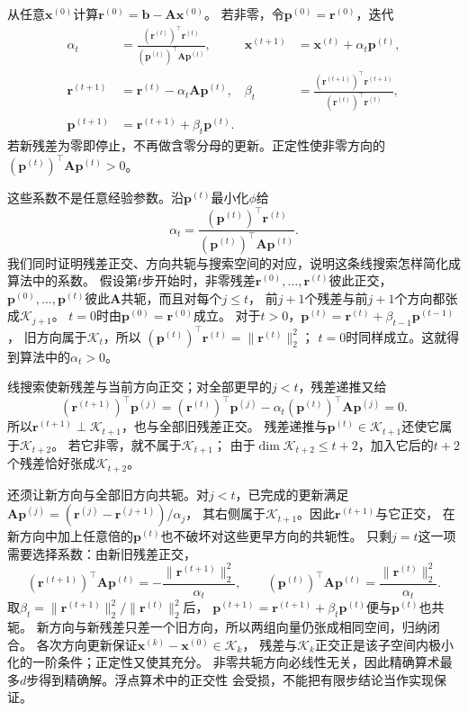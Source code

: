 从任意$\bm x^{(0)}$计算$\bm r^{(0)}=\bm b-\bm A\bm x^{(0)}$。
若非零，令$\bm p^{(0)}=\bm r^{(0)}$，迭代
\begin{align*}
 \alpha_t&=\frac{(\bm r^{(t)})^\top\bm r^{(t)}}
                 {(\bm p^{(t)})^\top\bm A\bm p^{(t)}},&
 \bm x^{(t+1)}&=\bm x^{(t)}+\alpha_t\bm p^{(t)},\\
 \bm r^{(t+1)}&=\bm r^{(t)}-\alpha_t\bm A\bm p^{(t)},&
 \beta_t&=\frac{(\bm r^{(t+1)})^\top\bm r^{(t+1)}}
                {(\bm r^{(t)})^\top\bm r^{(t)}},\\
 \bm p^{(t+1)}&=\bm r^{(t+1)}+\beta_t\bm p^{(t)}.
\end{align*}
若新残差为零即停止，不再做含零分母的更新。正定性使非零方向的
$(\bm p^{(t)})^\top\bm A\bm p^{(t)}>0$。

这些系数不是任意经验参数。沿$\bm p^{(t)}$最小化$\phi$给
\[
 \alpha_t=\frac{(\bm p^{(t)})^\top\bm r^{(t)}}
                 {(\bm p^{(t)})^\top\bm A\bm p^{(t)}}.
\]
我们同时证明残差正交、方向共轭与搜索空间的对应，说明这条线搜索怎样简化成算法中的系数。
假设第$t$步开始时，非零残差$\bm r^{(0)},\ldots,\bm r^{(t)}$彼此正交，
$\bm p^{(0)},\ldots,\bm p^{(t)}$彼此$\bm A$共轭，而且对每个$j\leq t$，
前$j+1$个残差与前$j+1$个方向都张成$\mathcal K_{j+1}$。
$t=0$时由$\bm p^{(0)}=\bm r^{(0)}$成立。
对于$t>0$，$\bm p^{(t)}=\bm r^{(t)}+\beta_{t-1}\bm p^{(t-1)}$，
旧方向属于$\mathcal K_t$，所以
$(\bm p^{(t)})^\top\bm r^{(t)}=\lVert\bm r^{(t)}\rVert_2^2$；
$t=0$时同样成立。这就得到算法中的$\alpha_t>0$。

线搜索使新残差与当前方向正交；对全部更早的$j<t$，残差递推又给
\[
 (\bm r^{(t+1)})^\top\bm p^{(j)}
 =(\bm r^{(t)})^\top\bm p^{(j)}
   -\alpha_t(\bm p^{(t)})^\top\bm A\bm p^{(j)}=0.
\]
所以$\bm r^{(t+1)}\perp\mathcal K_{t+1}$，也与全部旧残差正交。
残差递推与$\bm p^{(t)}\in\mathcal K_{t+1}$还使它属于$\mathcal K_{t+2}$。
若它非零，就不属于$\mathcal K_{t+1}$；
由于$\dim\mathcal K_{t+2}\leq t+2$，加入它后的$t+2$个残差恰好张成$\mathcal K_{t+2}$。

还须让新方向与全部旧方向共轭。对$j<t$，已完成的更新满足
$\bm A\bm p^{(j)}=(\bm r^{(j)}-\bm r^{(j+1)})/\alpha_j$，
其右侧属于$\mathcal K_{t+1}$。因此$\bm r^{(t+1)}$与它正交，
在新方向中加上任意倍的$\bm p^{(t)}$也不破坏对这些更早方向的共轭性。
只剩$j=t$这一项需要选择系数：由新旧残差正交，
\[
 (\bm r^{(t+1)})^\top\bm A\bm p^{(t)}
 =-\frac{\lVert\bm r^{(t+1)}\rVert_2^2}{\alpha_t},\qquad
 (\bm p^{(t)})^\top\bm A\bm p^{(t)}
 =\frac{\lVert\bm r^{(t)}\rVert_2^2}{\alpha_t}.
\]
取$\beta_t=\lVert\bm r^{(t+1)}\rVert_2^2/\lVert\bm r^{(t)}\rVert_2^2$后，
$\bm p^{(t+1)}=\bm r^{(t+1)}+\beta_t\bm p^{(t)}$便与$\bm p^{(t)}$也共轭。
新方向与新残差只差一个旧方向，所以两组向量仍张成相同空间，归纳闭合。
各次方向更新保证$\bm x^{(k)}-\bm x^{(0)}\in\mathcal K_k$，
残差与$\mathcal K_k$正交正是该子空间内极小化的一阶条件；正定性又使其充分。
非零共轭方向必线性无关，因此精确算术最多$d$步得到精确解。浮点算术中的正交性
会受损，不能把有限步结论当作实现保证。

